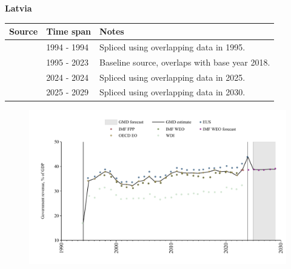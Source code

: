 \documentclass[12pt,a4paper,landscape]{article}
\begin{document}
\begin{adjustbox}{max totalsize={\paperwidth}{\paperheight},center}
\begin{minipage}[t][\textheight][t]{\textwidth}
\vspace*{0.5cm}
{}
\begin{center}
{\Large\bfseries Latvia}
\end{center}
\vspace{0.5cm}
\begin{table}[H]
\centering
\small
\begin{tabular}{|l|l|l|}
\hline
\textbf{Source} & \textbf{Time span} & \textbf{Notes} \\
\hline
\rowcolor{white}\cite{WDI}& 1994 - 1994 &Spliced using overlapping data in 1995.\\
\rowcolor{lightgray}\cite{OECD_EO}& 1995 - 2023 &Baseline source, overlaps with base year 2018.\\
\rowcolor{white}\cite{EUS}& 2024 - 2024 &Spliced using overlapping data in 2025.\\
\rowcolor{lightgray}\cite{IMF_WEO_forecast}& 2025 - 2029 &Spliced using overlapping data in 2030.\\
\hline
\end{tabular}
\end{table}
\begin{figure}[H]
\centering
\includegraphics[width=\textwidth,height=0.6\textheight,keepaspectratio]{graphs/LVA_govrev_GDP.pdf}
\end{figure}
\end{minipage}
\end{adjustbox}
\end{document}
